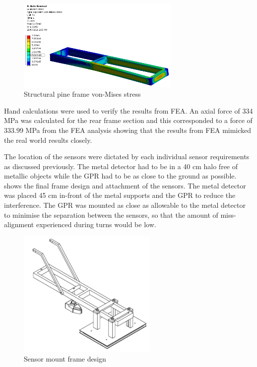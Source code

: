\documentclass[main.tex]{subfiles}
\begin{document}
\begin{figure}[ht]
\includegraphics[width=0.7\textwidth]{4-DetailedDesign/bottomframe.PNG}
\centering
\caption{Structural pine frame von-Mises stress} 
\end{figure}

Hand calculations were used to verify the results from FEA. An axial force of 334 MPa was calculated for the rear frame section and this corresponded to a force of 333.99 MPa from the FEA analysis showing that the results from FEA mimicked the real world results closely. 

The location of the sensors were dictated by each individual sensor requirements as discussed previously. The metal detector had to be in a 40 cm halo free of metallic objects while the GPR had to be as close to the ground as possible.  shows the final frame design and attachment of the sensors. The metal detector was placed 45 cm in-front of the metal supports and the GPR to reduce the interference. The GPR was mounted as close as allowable to the metal detector to minimise the separation between the sensors, so that the amount of miss-alignment experienced during turns would be low.  

\begin{figure}[ht]
\includegraphics[width=0.6\textwidth]{4-DetailedDesign/frame.PNG}
\centering
\caption{Sensor mount frame design} 
\end{figure} 
\end{document}
